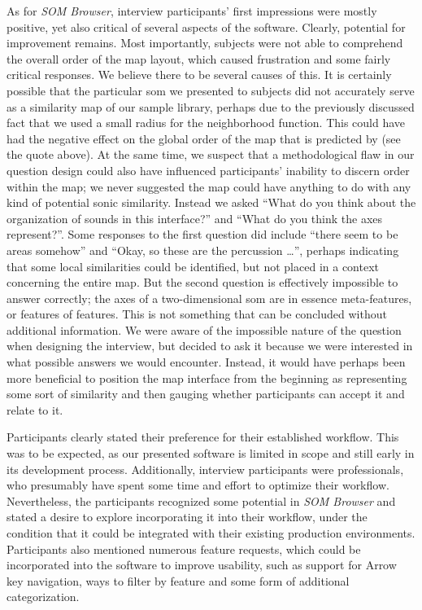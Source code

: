 \smallskip

As for \textit{SOM Browser}, interview participants' first impressions were
mostly positive, yet also critical of several aspects of the software. Clearly,
potential for improvement remains. Most importantly, subjects were not able to
comprehend the overall order of the map layout, which caused frustration and
some fairly critical responses. We believe there to be several causes of this.
It is certainly possible that the particular \gls{som} we presented to subjects
did not accurately serve as a similarity map of our sample library, perhaps due
to the previously discussed fact that we used a small radius for the
neighborhood function. This could have had the negative effect on the global
order of the map that is predicted by \citet{kohonen1990} (see the quote above).
At the same time, we suspect that a methodological flaw in our question design
could also have influenced participants' inability to discern order within the
map; we never suggested the map could have anything to do with any kind of
potential sonic similarity. Instead we asked ``What do you think about the
organization of sounds in this interface?'' and ``What do you think the axes
represent?''. Some responses to the first question did include ``there seem to
be areas somehow'' and ``Okay, so these are the percussion \dots'', perhaps
indicating that some local similarities could be identified, but not placed in a
context concerning the entire map. But the second question is effectively
impossible to answer correctly; the axes of a two-dimensional \gls{som} are in
essence meta-features, or features of features. This is not something that can
be concluded without additional information. We were aware of the impossible
nature of the question when designing the interview, but decided to ask it
because we were interested in what possible answers we would encounter. Instead,
it would have perhaps been more beneficial to position the map interface from
the beginning as representing some sort of similarity and then gauging whether
participants can accept it and relate to it.

\smallskip

Participants clearly stated their preference for their established workflow.
This was to be expected, as our presented software is limited in scope and still
early in its development process. Additionally, interview participants were
professionals, who presumably have spent some time and effort to optimize their
workflow. Nevertheless, the participants recognized some potential in
\textit{SOM Browser} and stated a desire to explore incorporating it into their
workflow, under the condition that it could be integrated with their existing
production environments. Participants also mentioned numerous feature requests,
which could be incorporated into the software to improve usability, such as
support for Arrow key navigation, ways to filter by feature and some form of
additional categorization.

